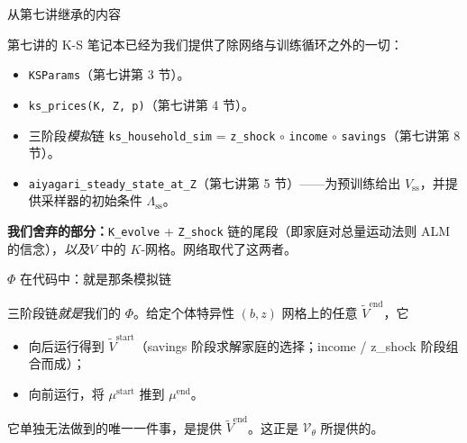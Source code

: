 \documentclass[10pt,aspectratio=169]{beamer}
\newcommand{\Vstarttil}{\widetilde{V}^{\mathrm{start}}}
\newcommand{\Vendtil}{\widetilde{V}^{\mathrm{end}}}
\newcommand{\CV}{\mathcal{V}}
\begin{document}
\begin{frame}{从第七讲继承的内容}

第七讲的 K-S 笔记本已经为我们提供了除网络与训练循环之外的一切：

\begin{itemize}
  \item \texttt{KSParams}（第七讲第 3 节）。
  \item \texttt{ks\_prices(K, Z, p)}（第七讲第 4 节）。
  \item 三阶段\emph{模拟}链 \texttt{ks\_household\_sim} = \texttt{z\_shock} $\circ$ \texttt{income} $\circ$ \texttt{savings}（第七讲第 8 节）。
  \item \texttt{aiyagari\_steady\_state\_at\_Z}（第七讲第 5 节）——为预训练给出 $V_{\mathrm{ss}}$，并提供采样器的初始条件 $\Lambda_{\mathrm{ss}}$。
\end{itemize}

\smallskip

\textbf{我们舍弃的部分：}\texttt{K\_evolve} + \texttt{Z\_shock} 链的尾段（即家庭对总量运动法则 ALM 的信念），\emph{以及}$V$ 中的 $K$-网格。网络取代了这两者。

\end{frame}

\begin{frame}{$\Phi$ 在代码中：就是那条模拟链}

三阶段链\emph{就是}我们的 $\Phi$。给定个体特异性 $(b, z)$ 网格上的任意 $\Vendtil$，它

\begin{itemize}
  \item 向后运行得到 $\Vstarttil$（savings 阶段求解家庭的选择；income / z\_shock 阶段组合而成）；
  \item 向前运行，将 $\mu^\text{start}$ 推到 $\mu^\text{end}$。
\end{itemize}

\smallskip

它单独无法做到的唯一一件事，是提供 $\Vendtil$。这正是 $\CV_\theta$ 所提供的。

\end{frame}
\end{document}
